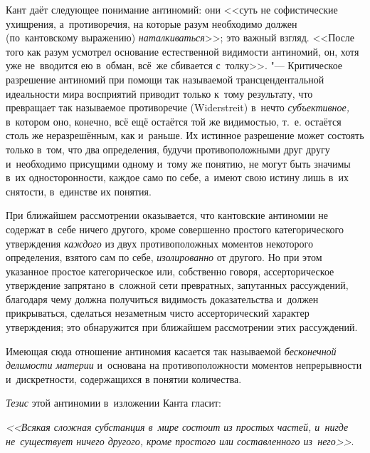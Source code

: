 Кант даёт следующее понимание антиномий: они <<суть не софистические
ухищрения, а~противоречия, на которые разум необходимо должен (по~кантовскому
выражению) {\em наталкиваться}>>; это важный взгляд. <<После того как
разум усмотрел основание естественной видимости антиномий, он, хотя уже
не~вводится ею в~обман, всё~же сбивается с~толку>>. "--- Критическое разрешение антиномий при помощи так
называемой трансцендентальной идеальности мира восприятий приводит только
к~тому результату, что превращает так называемое противоречие (Wider\-streit)
в~нечто {\em субъективное,} в~котором оно, конечно, всё ещё остаётся той же
видимостью, т.~е. остаётся столь же неразрешённым, как и~раньше. Их истинное
разрешение может состоять только в~том, что два определения, будучи
противоположными друг другу и~необходимо присущими одному и~тому же понятию, не
могут быть значимы в~их односторонности, каждое само по себе, а~имеют свою
истину лишь в~их снятости, в~единстве их понятия.

При ближайшем рассмотрении оказывается, что кантовские антиномии не содержат
в~себе ничего другого, кроме совершенно простого категорического
утверждения {\em каждого} из двух противоположных
моментов некоторого определения, взятого сам по себе,
{\em изолированно} от другого. Но при этом указанное
простое категорическое или, собственно говоря, ассерторическое утверждение
запрятано в~сложной сети превратных, запутанных рассуждений, благодаря чему
должна получиться видимость доказательства и~должен прикрываться, сделаться
незаметным чисто ассерторический характер утверждения; это обнаружится при
ближайшем рассмотрении этих рассуждений.

Имеющая сюда отношение антиномия касается так называемой
{\em бесконечной делимости материи} и~основана на
противоположности моментов непрерывности и~дискретности, содержащихся в
понятии количества.

{\em Тезис} этой антиномии в~изложении Канта гласит:

{\em <<Всякая сложная субстанция в~мире состоит из простых частей, и~нигде
не~существует ничего другого, кроме простого или составленного
из~него>>}.

